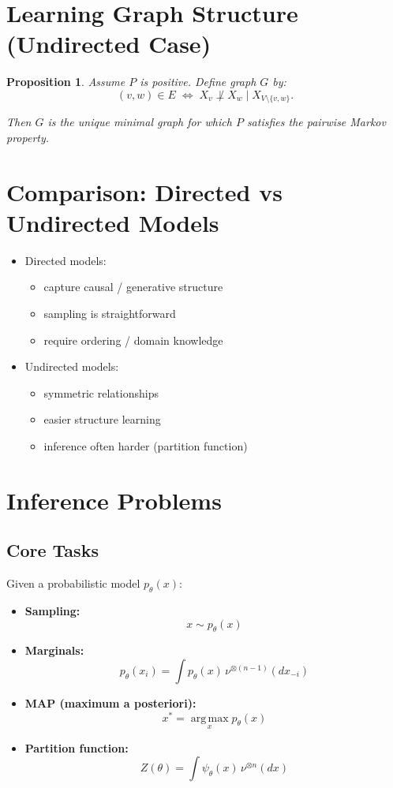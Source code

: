 \documentclass[12pt,oneside]{book}
\numberwithin{equation}{section}
\theoremstyle{definition}
\theoremstyle{plain}
\newtheorem{proposition}{Proposition}[section]
\theoremstyle{remark}
\newcommand{\argmax}{\operatorname*{arg\,max}}
\begin{document}
\section{Learning Graph Structure (Undirected Case)}

\begin{proposition}
Assume $P$ is positive. Define graph $G$ by:
\[
(v,w) \in E
\;\Longleftrightarrow\;
X_v \not\perp X_w \mid X_{V \setminus \{v,w\}}.
\]

Then $G$ is the unique minimal graph for which $P$ satisfies the pairwise Markov property.
\end{proposition}


\section*{Comparison: Directed vs Undirected Models}

\begin{itemize}
\item Directed models:
\begin{itemize}
\item capture causal / generative structure
\item sampling is straightforward
\item require ordering / domain knowledge
\end{itemize}

\item Undirected models:
\begin{itemize}
\item symmetric relationships
\item easier structure learning
\item inference often harder (partition function)
\end{itemize}
\end{itemize}

\section{Inference Problems}

\subsection{Core Tasks}

Given a probabilistic model $p_\theta(x)$:

\begin{itemize}
\item \textbf{Sampling:}
\[
x \sim p_\theta(x)
\]

\item \textbf{Marginals:}
\[
p_\theta(x_i) = \int p_\theta(x)\,\nu^{\otimes (n-1)}(dx_{-i})
\]

\item \textbf{MAP (maximum a posteriori):}
\[
x^* = \argmax_x p_\theta(x)
\]

\item \textbf{Partition function:}
\[
Z(\theta) = \int \psi_\theta(x)\,\nu^{\otimes n}(dx)
\]
\end{itemize}
\end{document}
